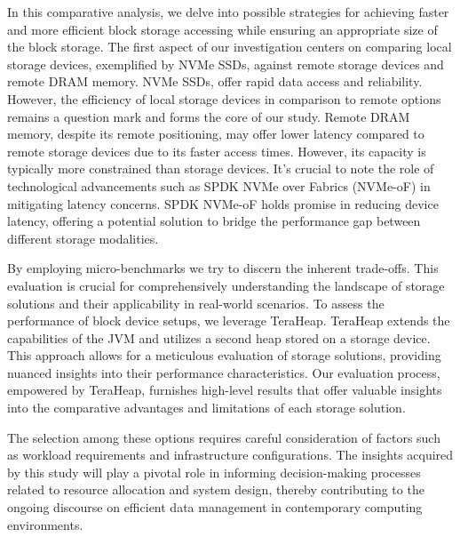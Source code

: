 

In this comparative analysis, we delve into possible strategies for achieving
faster and more efficient block storage accessing while ensuring an appropriate
size of the block storage. The first aspect of our investigation centers on
comparing local storage devices, exemplified by NVMe SSDs, against remote
storage devices and remote DRAM memory. NVMe SSDs, offer rapid data access and
reliability. However, the efficiency of local storage devices in comparison to
remote options remains a question mark and forms the core of our study. Remote
DRAM memory, despite its remote positioning, may offer lower latency compared to
remote storage devices due to its faster access times. However, its capacity is
typically more constrained than storage devices. It's crucial to note the role
of technological advancements such as SPDK NVMe over Fabrics (NVMe-oF) in
mitigating latency concerns. SPDK NVMe-oF holds promise in reducing device
latency, offering a potential solution to bridge the performance gap between
different storage modalities. 

By employing micro-benchmarks we try to discern the inherent trade-offs. This
evaluation is crucial for comprehensively understanding the landscape of storage
solutions and their applicability in real-world scenarios. To assess the
performance of block device setups, we leverage TeraHeap. TeraHeap extends the
capabilities of the JVM and utilizes a second heap stored on a storage device.
This approach allows for a meticulous evaluation of storage solutions, providing
nuanced insights into their performance characteristics. Our evaluation process,
empowered by TeraHeap, furnishes high-level results that offer valuable insights
into the comparative advantages and limitations of each storage solution.

The selection among these options requires careful consideration of factors such
as workload requirements and infrastructure configurations. The insights
acquired by this study will play a pivotal role in informing decision-making
processes related to resource allocation and system design, thereby contributing
to the ongoing discourse on efficient data management in contemporary computing
environments.

